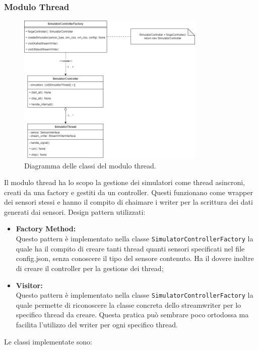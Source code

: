 \documentclass[8pt]{article}
\begin{document}
\subsubsection{Modulo Thread}
\begin{figure}[h!]
    \centering
    \includegraphics[width=0.8\textwidth]{images_st/threads.png}
    \caption{Diagramma delle classi del modulo thread.}
    \label{fig:Diagramma delle classi del modulo thread}
\end{figure}
Il modulo thread ha lo scopo la gestione dei simulatori come thread asincroni, creati da una factory e gestiti da un controller. Questi funzionano come wrapper dei sensori stessi e hanno il compito di chaimare i writer per la scrittura dei dati generati dai sensori.
Design pattern utilizzati: 
\begin{itemize}
	\setlength\itemsep{0em}
    \item \textbf{Factory Method:} 
    \\Questo pattern è implementato nella classe \verb|SimulatorControllerFactory| la quale ha il compito di creare tanti thread quanti sensori specificati nel file config.json, senza conoscere il tipo del sensore contenuto. Ha il dovere inoltre di creare il controller per la gestione dei thread;
    \item \textbf{Visitor:}
    \\Questo pattern è implementato nella classe \verb|SimulatorControllerFactory| la quale permette di riconoscere la classe concreta dello streamwriter per lo specifico thread da creare. Questa pratica può sembrare poco ortodossa ma facilita l'utilizzo del writer per ogni specifico thread.
\end{itemize}
Le classi implementate sono:
\end{document}
